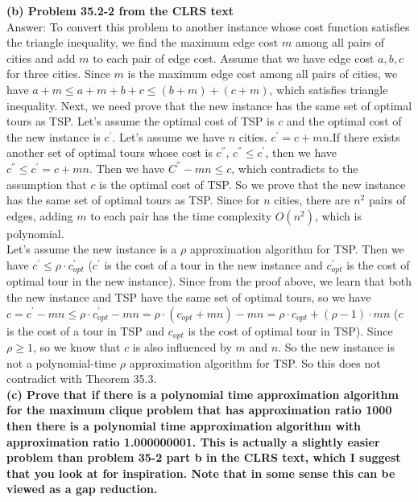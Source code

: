 \documentclass{article}
\begin{document}
\textbf{(b) Problem 35.2-2 from the CLRS text} \\ \newline
Answer: To convert this problem to another instance whose cost function satisfies the triangle inequality, we find the maximum edge cost $m$ among all pairs of cities and add $m$ to each pair of edge cost. Assume that we have edge cost $a, b, c$ for three cities. Since $m$ is the maximum edge cost among all pairs of cities, we have $a + m \leq a + m + b + c \leq (b + m) + (c + m)$, which satisfies triangle inequality. Next, we need prove that the new instance has the same set of optimal tours as TSP. Let's assume the optimal cost of TSP is $c$ and the optimal cost of the new instance is $c^{'}$. Let's assume we have $n$ cities. $c^{'} = c + mn$.If there exists another set of optimal tours whose cost is $c^{''}$, $c^{''}\leq c^{'}$, then we have $c^{''}\leq c^{'} = c + mn$. Then we have $C^{''} - mn \leq c$, which contradicts to the assumption that $c$ is the optimal cost of TSP. So we prove that the new instance has the same set of optimal tours as TSP. Since for $n$ cities, there are $n^2$ pairs of edges, adding $m$ to each pair has the time complexity $O(n^2)$, which is polynomial.\\ \newline
Let's assume the new instance is a $\rho$ approximation algorithm for TSP. Then we have $c^{'} \leq \rho \cdot c_{opt}^{'}$ ($c^{'}$ is the cost of a tour in the new instance and $c_{opt}^{'}$ is the cost of optimal tour in the new instance). Since from the proof above, we learn that both the new instance and TSP have the same set of optimal tours, so we have $c = c^{'} - mn \leq \rho \cdot c_{opt}^{'} - mn = \rho \cdot (c_{opt} + mn) - mn = \rho \cdot c_{opt} + (\rho - 1)\cdot mn$ ($c$ is the cost of a tour in TSP and $c_{opt}$ is the cost of optimal tour in TSP). Since $\rho \geq 1$, so we know that $c$ is also influenced by $m$ and $n$. So the new instance is not a polynomial-time $\rho$ approximation algorithm for TSP. So this does not contradict with Theorem 35.3.\\ \newline
\textbf{(c) Prove that if there is a polynomial time approximation algorithm for the maximum clique problem that has approximation ratio 1000 then there is a polynomial time approximation algorithm with approximation ratio 1.000000001. This is actually a slightly easier problem than problem 35-2 part b in the CLRS text, which I suggest that you look at for inspiration. Note that in some sense this can be viewed as a gap reduction.}\\ \newline
\end{document}
